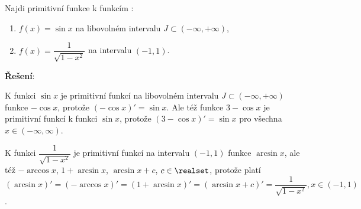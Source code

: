 \begin{mdframed}[style=mdexam]
  \begin{example}\label{mai:exam118}
    Najdi primitivní funkce k funkcím \cite[s.~254]{Brabec1989}:
    \begin{enumerate}
      \item \(f(x) = \sin x\) na libovolném intervalu \(J\subset(-\infty,+\infty)\),
      \item \(f(x) = \dfrac{1}{\sqrt{1-x^2}}\) na intervalu \((-1, 1)\).
    \end{enumerate}
    \vspace{1em}
    \textbf{Řešení}:\newline

    K funkci \(\sin x\) je primitivní funkcí na libovolném intervalu \(J\subset(-\infty,+\infty)\) 
    funkce \(-\cos x\), protože \((-\cos x)' = \sin x\). Ale též funkce \(3-\cos x\) je primitivní 
    funkcí k funkci \(\sin x\), protože \((3 - \cos x)' = \sin x\) pro všechna \(x\in(-\infty, 
    \infty)\).

    K funkci  \(\dfrac{1}{\sqrt{1-x^2}}\) je primitivní funkcí na intervalu \((-1, 1)\) funkce
    \(\arcsin x\), ale též \(-\arccos x\), \(1 + \arcsin x\), \(\arcsin x + c\), \(c\in\realset\),
    protože platí \((\arcsin x)' = (-\arccos x)' = (1+\arcsin x)' = (\arcsin x + c)' =
    \dfrac{1}{\sqrt{1-x^2}}, x\in(-1, 1)\).
  \end{example}
\end{mdframed}